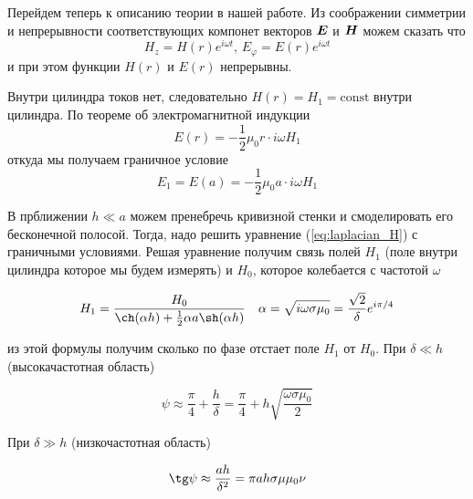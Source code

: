 \documentclass[a4paper, 12pt]{article}
\begin{document}
	Перейдем теперь к описанию теории в нашей работе. Из соображении симметрии и 
	непрерывности соответствующих компонет векторов $\vb*{E}$ и $\vb*{H}$ можем сказать что
	\begin{equation*}
		H_z = H(r)e^{i\omega t} \text{, } E_\varphi = E(r)e^{i\omega t}
	\end{equation*}
	и при этом функции $H(r)$ и $E(r)$ непрерывны.
	
	Внутри цилиндра токов нет, следовательно $H(r)=H_1=\text{const}$ внутри цилиндра.
	По теореме об электромагнитной индукции
	\begin{equation*}
		E(r) = -\frac{1}{2}\mu_0 r \cdot i \omega H_1
	\end{equation*}
	откуда мы получаем граничное условие
	\begin{equation}
		E_1=E(a)= -\frac{1}{2}\mu_0 a \cdot i \omega H_1
		\label{eq:granichnoe_uslovie_E}
	\end{equation}
	
	В прближении $h \ll a$ можем пренебречь кривизной стенки и смоделировать 
	его бесконечной полосой. Тогда, надо решить уравнение (\ref{eq:laplacian_H})
	с граничными условиями. Решая уравнение получим связь полей $H_1$ 
	(поле внутри цилиндра которое мы будем измерять) и $H_0$, которое колебается с частотой
	$\omega$
	
	\begin{equation}
		H_1 = \frac{H_0}{\ch(\alpha h) + \frac{1}{2} \alpha a \sh(\alpha h)} 
		\text{\ \ \ }
		\alpha = \sqrt{i\omega \sigma \mu_0} = \frac{\sqrt{2}}{\delta}e^{i\pi/4}
		\label{eq:svyaz_poley}
	\end{equation}
	
	из этой формулы получим сколько по фазе отстает поле $H_1$ от $H_0$. При $\delta \ll h$
	(высокачастотная область)
	
	\begin{equation}
		\psi \approx \frac{\pi}{4} + \frac{h}{\delta} = 
		\frac{\pi}{4} + h \sqrt{\frac{\omega \sigma \mu_0}{2}}
		\label{eq:faza_high_freq}
	\end{equation}
	
	При $\delta \gg h$ (низкочастотная область)
	
	\begin{equation}
		\tg \psi \approx \frac{ah}{\delta^2} = \pi a h \sigma \mu \mu_0 \nu
		\label{eq:faza_low_freq}
	\end{equation}
	
\end{document}
